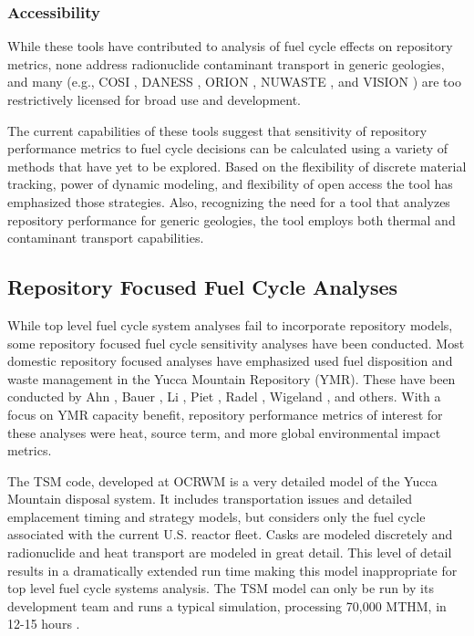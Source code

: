 \subsubsection{Accessibility}

While these tools have contributed to analysis of fuel cycle effects on 
repository metrics, none address radionuclide contaminant transport in generic 
geologies, and many (e.g.,
\gls{COSI} \cite{boucher_international_2010},
\gls{DANESS} \cite{yacout_daness_2011,van_den_durpel_daness:_2006}, 
ORION \cite{gregg_orion_2011},
\gls{NUWASTE} \cite{abkowitz_nuclear_2010}, and
\gls{VISION} \cite{yacout_vision_2006, wilson_comparing_2011, radel_repository_2007, boucher_international_2010}
) are too restrictively licensed for broad use and development. 


The current capabilities of these tools suggest that sensitivity of repository 
performance metrics to fuel cycle decisions can be calculated using a variety of 
methods that have yet to be explored. Based on the flexibility of discrete material 
tracking, power of dynamic modeling, and flexibility of open access the \Cyder 
tool has emphasized those strategies. Also, recognizing the need for a tool 
that analyzes repository performance for generic geologies, the \Cyder tool 
employs both thermal and contaminant transport capabilities.

\subsection{Repository Focused Fuel Cycle Analyses}

While top level fuel cycle system analyses fail to incorporate repository 
models, some repository focused fuel cycle sensitivity analyses have been conducted. 
Most domestic repository focused analyses have emphasized used fuel disposition and
waste management in the Yucca Mountain Repository (YMR). These have been conducted by
Ahn \cite{ahn_environmental_2007}, 
Bauer \cite{bauer_geologic_2007}, 
Li \cite{li_examining_2007}, 
Piet \cite{piet_which_2007}, 
Radel \cite{radel_determination_2007}, 
Wigeland \cite{wigeland_criteria_2006,wigeland_separations_2006}, 
and others. With a focus on YMR capacity benefit, 
repository performance metrics of interest for these analyses were heat, source 
term, and more global environmental impact metrics.  

The \gls{TSM} code, 
developed at \gls{OCRWM} is a very detailed model of the Yucca Mountain disposal 
system. It includes transportation issues and detailed emplacement timing and 
strategy models, but considers only the fuel cycle associated with the current  
U.S.  reactor fleet. Casks are modeled discretely and radionuclide and heat transport 
are modeled in great detail.  This level of detail results in a dramatically extended
run time making this model inappropriate for top level fuel cycle systems analysis. 
The \gls{TSM} model can only be run by its development team and runs a typical 
simulation, processing 70,000 MTHM, in 12-15 hours \cite{turner_discrete_2010}. 

